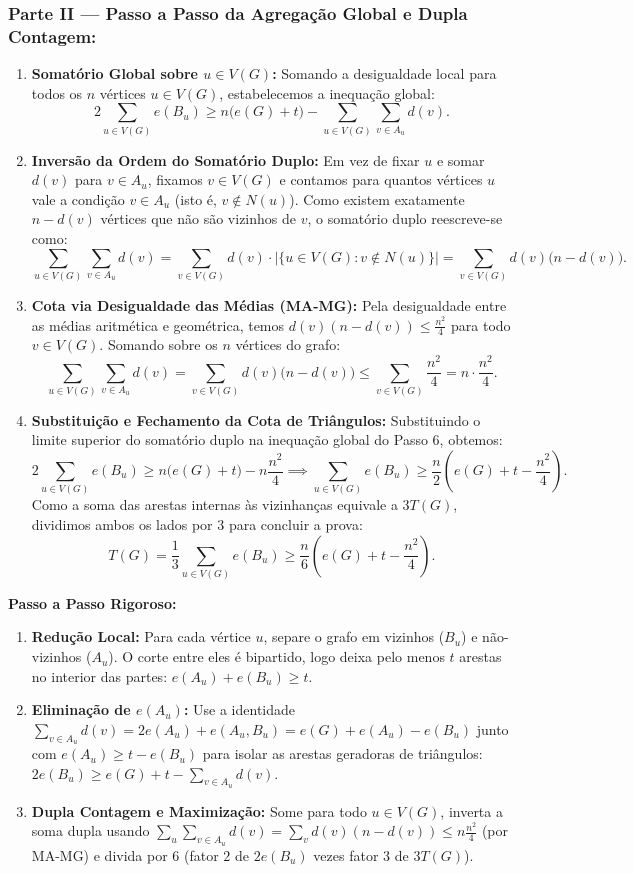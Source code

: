 \documentclass[11pt, a4paper]{article}
\begin{document}
\subsubsection{Parte II --- Passo a Passo da Agregação Global e Dupla Contagem:}
\begin{enumerate}[resume]
    \item \textbf{Somatório Global sobre $u \in V(G)$:} Somando a desigualdade local para todos os $n$ vértices $u \in V(G)$, estabelecemos a inequação global:
    \[ 2\sum_{u \in V(G)} e(B_u) \ge n\big(e(G) + t\big) - \sum_{u \in V(G)} \sum_{v \in A_u} d(v). \]
    \item \textbf{Inversão da Ordem do Somatório Duplo:} Em vez de fixar $u$ e somar $d(v)$ para $v \in A_u$, fixamos $v \in V(G)$ e contamos para quantos vértices $u$ vale a condição $v \in A_u$ (isto é, $v \notin N(u)$). Como existem exatamente $n - d(v)$ vértices que não são vizinhos de $v$, o somatório duplo reescreve-se como:
    \[ \sum_{u \in V(G)} \sum_{v \in A_u} d(v) = \sum_{v \in V(G)} d(v) \cdot |\{u \in V(G) : v \notin N(u)\}| = \sum_{v \in V(G)} d(v)\big(n - d(v)\big). \]
    \item \textbf{Cota via Desigualdade das Médias (MA-MG):} Pela desigualdade entre as médias aritmética e geométrica, temos $d(v)(n - d(v)) \le \frac{n^2}{4}$ para todo $v \in V(G)$. Somando sobre os $n$ vértices do grafo:
    \[ \sum_{u \in V(G)} \sum_{v \in A_u} d(v) = \sum_{v \in V(G)} d(v)\big(n - d(v)\big) \le \sum_{v \in V(G)} \frac{n^2}{4} = n \cdot \frac{n^2}{4}. \]
    \item \textbf{Substituição e Fechamento da Cota de Triângulos:} Substituindo o limite superior do somatório duplo na inequação global do Passo 6, obtemos:
    \[ 2\sum_{u \in V(G)} e(B_u) \ge n\big(e(G) + t\big) - n\frac{n^2}{4} \implies \sum_{u \in V(G)} e(B_u) \ge \frac{n}{2}\left(e(G) + t - \frac{n^2}{4}\right). \]
    Como a soma das arestas internas às vizinhanças equivale a $3T(G)$, dividimos ambos os lados por $3$ para concluir a prova:
    \[ T(G) = \frac{1}{3}\sum_{u \in V(G)} e(B_u) \ge \frac{n}{6}\left(e(G) + t - \frac{n^2}{4}\right). \]
\end{enumerate}

\textbf{Passo a Passo Rigoroso:}
\begin{enumerate}
    \item \textbf{Redução Local:} Para cada vértice $u$, separe o grafo em vizinhos ($B_u$) e não-vizinhos ($A_u$). O corte entre eles é bipartido, logo deixa pelo menos $t$ arestas no interior das partes: $e(A_u) + e(B_u) \ge t$.
    \item \textbf{Eliminação de $e(A_u)$:} Use a identidade $\sum_{v \in A_u} d(v) = 2e(A_u) + e(A_u, B_u) = e(G) + e(A_u) - e(B_u)$ junto com $e(A_u) \ge t - e(B_u)$ para isolar as arestas geradoras de triângulos: $2e(B_u) \ge e(G) + t - \sum_{v \in A_u} d(v)$.
    \item \textbf{Dupla Contagem e Maximização:} Some para todo $u \in V(G)$, inverta a soma dupla usando $\sum_{u}\sum_{v \in A_u} d(v) = \sum_{v} d(v)(n-d(v)) \le n\frac{n^2}{4}$ (por MA-MG) e divida por $6$ (fator $2$ de $2e(B_u)$ vezes fator $3$ de $3T(G)$).
\end{enumerate}
\end{document}

